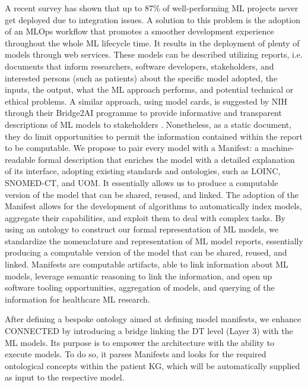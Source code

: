 A recent survey has shown that up to 87\% of well-performing ML projects never get deployed due to integration issues\cite{venturebeat_why_2019}. A solution to this problem is the adoption of an MLOps workflow that promotes a smoother development experience throughout the whole ML lifecycle time. It results in the deployment of plenty of models through web services. These models can be described utilizing reports, i.e. documents that inform researchers, software developers, stakeholders, and interested persons (such as patients) about the specific model adopted, the inputs, the output, what the ML approach performs, and potential technical or ethical problems. A similar approach, using model cards, is suggested by NIH through their Bridge2AI programme to provide informative and transparent descriptions of ML models to stakeholders \cite{Amith2022}. Nonetheless, as a static document, they do limit opportunities to permit the information contained within the report to be computable.
We propose to pair every model with a Manifest: a machine-readable formal description that enriches the model with a detailed explanation of its interface, adopting existing standards and ontologies, such as LOINC, SNOMED-CT, and UOM. It essentially allows us to produce a computable version of the model that can be shared, reused, and linked. The adoption of the Manifest allows for the development of algorithms to automatically index models, aggregate their capabilities, and exploit them to deal with complex tasks. By using an ontology to construct our formal representation of ML models, we standardize the nomenclature and representation of ML model reports, essentially producing a computable version of the model that can be shared, reused, and linked. Manifests are computable artifacts, able to link information about ML models, leverage semantic reasoning to link the information, and open up software tooling opportunities, aggregation of models, and querying of the information for healthcare ML research.

After defining a bespoke ontology aimed at defining model manifests, we enhance CONNECTED by introducing a bridge linking the DT level (Layer 3) with the ML models. Its purpose is to empower the architecture with the ability to execute models. To do so, it parses Manifests and looks for the required ontological concepts within the patient KG, which will be automatically supplied as input to the respective model. 

